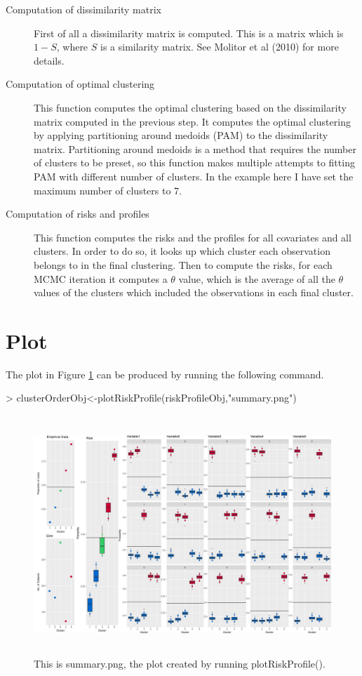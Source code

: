 \documentclass{article}
\begin{document}
\begin{description}
\item[Computation of dissimilarity matrix] First of all a dissimilarity matrix is computed. This is a matrix which is $1-S$, where $S$ is a similarity matrix. See \cite{Molitor10} Molitor et al (2010) for more details.   
\item[Computation of optimal clustering] This function computes the optimal clustering based on the dissimilarity matrix computed in the previous step. It computes the optimal clustering by applying partitioning around medoids (PAM) to the dissimilarity matrix. Partitioning around medoids is a method that requires the number of clusters to be preset, so this function makes multiple attempts to fitting PAM with different number of clusters. In the example here I have set the maximum number of clusters to 7. 
\item[Computation of risks and profiles] This function computes the risks and the profiles for all covariates and all clusters. In order to do so, it looks up which cluster each observation belongs to in the final clustering. Then to compute the risks, for each MCMC iteration it computes a $\theta$ value, which is the average of all the $\theta$ values of the clusters which included the observations in each final cluster.  
\end{description}

\section{Plot}
The plot in Figure \ref{fig:summary} can be produced by running the following command. 
\begin{Schunk}
\begin{Sinput}
> clusterOrderObj<-plotRiskProfile(riskProfileObj,"summary.png")
\end{Sinput}
\end{Schunk}


\begin{figure}[ht]
\centering
\includegraphics[height=9cm]{"summary"}
\caption{This is summary.png, the plot created by running plotRiskProfile().\label{fig:summary}}
\end{figure}
\end{document}
